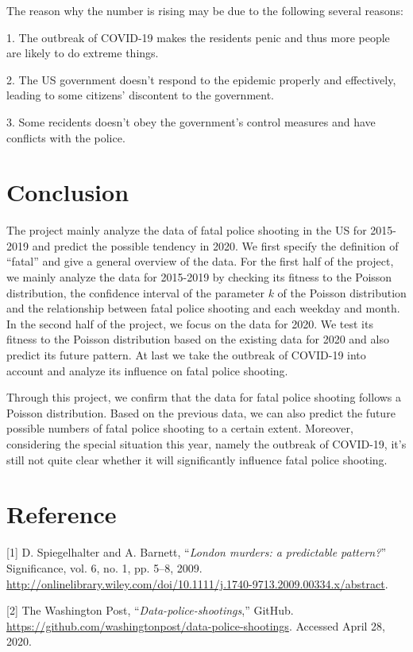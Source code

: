 \documentclass[a4paper]{article}
\begin{document}
	The reason why the number is rising may be due to the following several reasons:
	
	1. The outbreak of COVID-19 makes the residents penic and thus more people are likely to do extreme things.
	
	2. The US government doesn't respond to the epidemic properly and effectively, leading to some citizens' discontent to the government.

	3. Some recidents doesn't obey the government's control measures and have conflicts with the police.
	
\section{Conclusion}
	
	The project mainly analyze the data of fatal police shooting in the US for 2015-2019 and predict the possible tendency in 2020. We first specify the definition of “fatal” and give a general overview of the data. For the first half of the project, we mainly analyze the data for 2015-2019 by checking its fitness to the Poisson distribution, the confidence interval of the parameter $k$ of the Poisson distribution and the relationship between fatal police shooting and each weekday and month. In the second half of the project, we focus on the data for 2020. We test its fitness to the Poisson distribution based on the existing data for 2020 and also predict its future pattern. At last we take the outbreak of COVID-19 into account and analyze its influence on fatal police shooting.
	
	Through this project, we confirm that the data for fatal police shooting follows a Poisson distribution. Based on the previous data, we can also predict the future possible numbers of fatal police shooting to a certain extent. Moreover, considering the special situation this year, namely the outbreak of COVID-19, it's still not quite clear whether it will significantly influence fatal police shooting.


\section{Reference}
[1] D. Spiegelhalter and A. Barnett, “\textit{London murders: a predictable pattern?}” Significance, vol. 6, no. 1, pp. 5–8, 2009. \url{http://onlinelibrary.wiley.com/doi/10.1111/j.1740-9713.2009.00334.x/abstract}.

[2] The Washington Post, “\textit{Data-police-shootings},” GitHub. \url{https://github.com/washingtonpost/data-police-shootings}. Accessed April 28, 2020.
\end{document}
